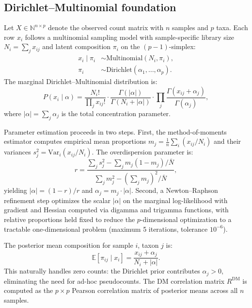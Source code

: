 \documentclass[fleqn]{nature}
\newcommand{\E}{\mathbb{E}}
\newcommand{\N}{\mathbb{N}}
\newcommand{\Var}{\mathrm{Var}}
\begin{document}
\begin{methods}

\subsection*{Dirichlet--Multinomial foundation}

Let $X \in \N^{n \times p}$ denote the observed count matrix with $n$ samples and $p$ taxa.
Each row $x_i$ follows a multinomial sampling model with sample-specific library size $N_i = \sum_j x_{ij}$ and latent composition $\pi_i$ on the $(p-1)$-simplex:
\begin{align}
x_i \mid \pi_i &\sim \mathrm{Multinomial}(N_i, \pi_i), \\
\pi_i &\sim \mathrm{Dirichlet}(\alpha_1, \ldots, \alpha_p).
\end{align}
The marginal Dirichlet--Multinomial distribution is:
\begin{equation}
P(x_i \mid \alpha) = \frac{N_i!}{\prod_j x_{ij}!} \cdot \frac{\Gamma(|\alpha|)}{\Gamma(N_i + |\alpha|)} \cdot \prod_j \frac{\Gamma(x_{ij} + \alpha_j)}{\Gamma(\alpha_j)},
\end{equation}
where $|\alpha| = \sum_j \alpha_j$ is the total concentration parameter.

Parameter estimation proceeds in two steps.
First, the method-of-moments estimator computes empirical mean proportions $m_j = \frac{1}{n}\sum_i (x_{ij}/N_i)$ and their variances $s_j^2 = \Var_i(x_{ij}/N_i)$.
The overdispersion parameter is:
\begin{equation}
r = \frac{\sum_j s_j^2 - \sum_j m_j(1 - m_j)/\bar{N}}{\sum_j m_j^2 - (\sum_j m_j)^2/\bar{N}},
\end{equation}
yielding $|\alpha| = (1-r)/r$ and $\alpha_j = m_j \cdot |\alpha|$.
Second, a Newton--Raphson refinement step optimizes the scalar $|\alpha|$ on the marginal log-likelihood with gradient and Hessian computed via digamma and trigamma functions, with relative proportions held fixed to reduce the $p$-dimensional optimization to a tractable one-dimensional problem (maximum 5 iterations, tolerance $10^{-6}$).

The posterior mean composition for sample $i$, taxon $j$ is:
\begin{equation}
\E[\pi_{ij} \mid x_i] = \frac{x_{ij} + \alpha_j}{N_i + |\alpha|}.
\end{equation}
This naturally handles zero counts: the Dirichlet prior contributes $\alpha_j > 0$, eliminating the need for ad-hoc pseudocounts.
The DM correlation matrix $R^{\text{DM}}$ is computed as the $p \times p$ Pearson correlation matrix of posterior means across all $n$ samples.


\end{methods}
\end{document}
